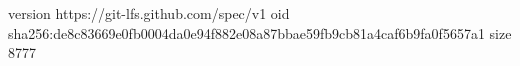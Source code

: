 version https://git-lfs.github.com/spec/v1
oid sha256:de8c83669e0fb0004da0e94f882e08a87bbae59fb9cb81a4caf6b9fa0f5657a1
size 8777

